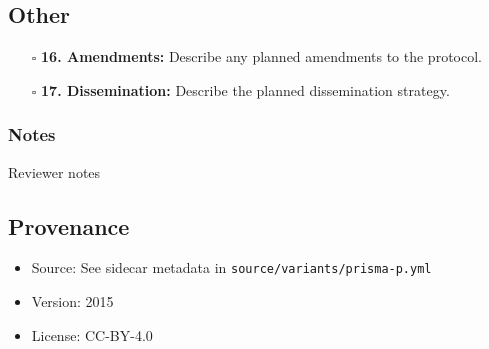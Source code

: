 \documentclass[11pt]{article}
\def\tightlist{}
\begin{document}
\begin{Form}
\subsection{Other}\label{other}

\begin{itemize}
\tightlist
\item[$\square$]
  \textbf{16. Amendments:} Describe any planned amendments to the
  protocol.
\item[$\square$]
  \textbf{17. Dissemination:} Describe the planned dissemination
  strategy.
\end{itemize}

\subsubsection{Notes}\label{notes}

{Reviewer notes}

\subsection{Provenance}\label{provenance}

\begin{itemize}
\tightlist
\item
  Source: See sidecar metadata in \texttt{source/variants/prisma-p.yml}
\item
  Version: 2015
\item
  License: CC-BY-4.0
\end{itemize}

\end{Form}
\end{document}
